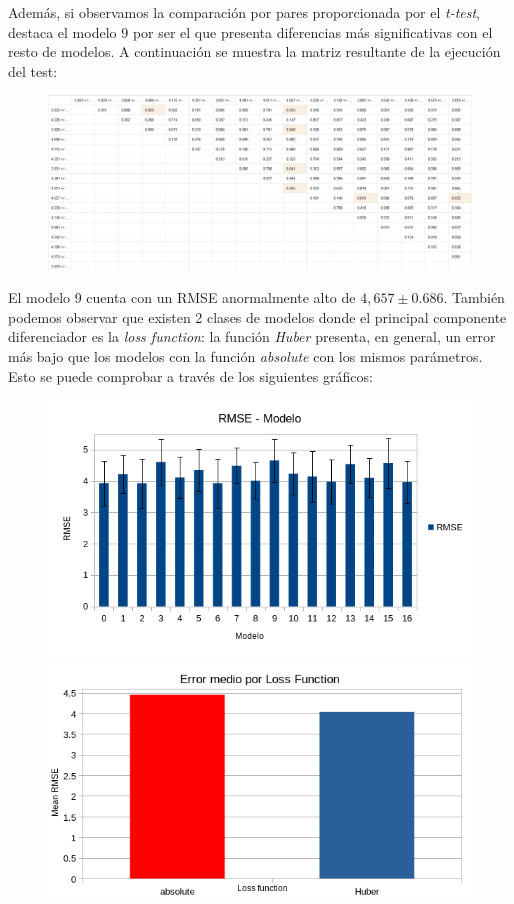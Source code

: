 \documentclass[12pt]{report} %
\begin{document}
    Además, si observamos la comparación por pares proporcionada por el \textit{t-test}, destaca el modelo 9 por ser el que presenta diferencias más significativas con el resto de modelos. A continuación se muestra la matriz resultante de la ejecución del test:

\begin{figure}[H]
    \includegraphics[width=\linewidth]{t-test.jpeg}
\end{figure}

    El modelo 9 cuenta con un RMSE anormalmente alto de $4,657\pm 0.686$. También podemos observar que existen 2 clases de modelos donde el principal componente diferenciador es la \textit{loss function}: la función \textit{Huber} presenta, en general, un error más bajo que los modelos con la función \textit{absolute} con los mismos parámetros. Esto se puede comprobar a través de los siguientes gráficos:

\begin{figure}[H]
    \includegraphics[width=\linewidth]{RMSE-models.png}\\
    \includegraphics[width=\linewidth]{error-lossfunction.png}
\end{figure}
\end{document}
